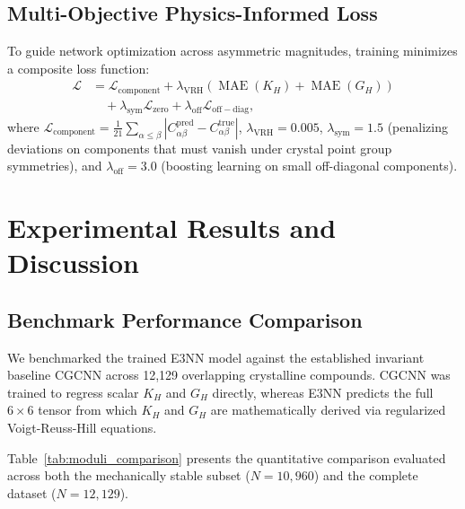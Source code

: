 \documentclass[twocolumn,10pt,aps,prb,superscriptaddress,floatfix]{revtex4-2}
\begin{document}
\subsection{Multi-Objective Physics-Informed Loss}
To guide network optimization across asymmetric magnitudes, training minimizes a composite loss function:
\begin{align}
\mathcal{L} &= \mathcal{L}_{\mathrm{component}} + \lambda_{\mathrm{VRH}} \left( \operatorname{MAE}(K_H) + \operatorname{MAE}(G_H) \right) \nonumber \\
            &\quad + \lambda_{\mathrm{sym}} \mathcal{L}_{\mathrm{zero}} + \lambda_{\mathrm{off}} \mathcal{L}_{\mathrm{off-diag}},
\label{eq:loss}
\end{align}
where $\mathcal{L}_{\mathrm{component}} = \frac{1}{21}\sum_{\alpha \le \beta} |C_{\alpha\beta}^{\mathrm{pred}} - C_{\alpha\beta}^{\mathrm{true}}|$, $\lambda_{\mathrm{VRH}} = 0.005$, $\lambda_{\mathrm{sym}} = 1.5$ (penalizing deviations on components that must vanish under crystal point group symmetries), and $\lambda_{\mathrm{off}} = 3.0$ (boosting learning on small off-diagonal components).

\section{Experimental Results and Discussion}
\label{sec:results}

\subsection{Benchmark Performance Comparison}
We benchmarked the trained E3NN model against the established invariant baseline CGCNN across 12,129 overlapping crystalline compounds. CGCNN was trained to regress scalar $K_H$ and $G_H$ directly, whereas E3NN predicts the full $6 \times 6$ tensor from which $K_H$ and $G_H$ are mathematically derived via regularized Voigt-Reuss-Hill equations.

Table~\ref{tab:moduli_comparison} presents the quantitative comparison evaluated across both the mechanically stable subset ($N = 10,960$) and the complete dataset ($N = 12,129$).
\end{document}

